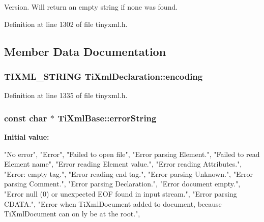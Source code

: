 Version. Will return an empty string if none was found. 



Definition at line 1302 of file tinyxml.h.



\subsection{Member Data Documentation}
\hypertarget{classTiXmlDeclaration_a24b8645d7696ec169bbb3fb7d30860cf}{
\subsubsection[{encoding}]{\setlength{\rightskip}{0pt plus 5cm}TIXML\_\-STRING {\bf TiXmlDeclaration::encoding}}}
\label{d2/df2/classTiXmlDeclaration_a24b8645d7696ec169bbb3fb7d30860cf}


Definition at line 1335 of file tinyxml.h.

\hypertarget{classTiXmlBase_a7ac8feec4100e446b3d78e1ac0659700}{
\subsubsection[{errorString}]{\setlength{\rightskip}{0pt plus 5cm}const char $\ast$ {\bf TiXmlBase::errorString}}}
\label{d8/d47/classTiXmlBase_a7ac8feec4100e446b3d78e1ac0659700}
{\bfseries Initial value:}
\begin{DoxyCode}

{
        "No error",
        "Error",
        "Failed to open file",
        "Error parsing Element.",
        "Failed to read Element name",
        "Error reading Element value.",
        "Error reading Attributes.",
        "Error: empty tag.",
        "Error reading end tag.",
        "Error parsing Unknown.",
        "Error parsing Comment.",
        "Error parsing Declaration.",
        "Error document empty.",
        "Error null (0) or unexpected EOF found in input stream.",
        "Error parsing CDATA.",
        "Error when TiXmlDocument added to document, because TiXmlDocument can on
      ly be at the root.",
}
\end{DoxyCode}


